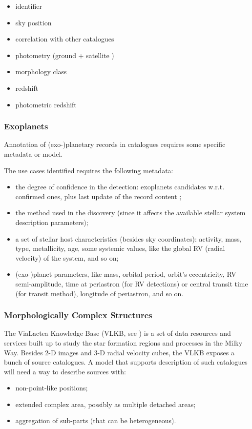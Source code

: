 \documentclass[11pt,a4paper]{ivoa}
\begin{document}
\begin{itemize}
    \item identifier
    \item sky position
    \item correlation with other catalogues
    \item photometry (ground + satellite )
    \item morphology class
    \item redshift
    \item photometric redshift
\end{itemize}

\subsubsection{Exoplanets}
Annotation of (exo-)planetary records in catalogues requires some
specific metadata or model.

The use cases identified requires the following metadata:
\begin{itemize}
	\item the degree of confidence in the detection: exoplanets candidates
w.r.t. confirmed ones, plus last update of the record content ;
	\item the method used in the discovery (since it affects the available
stellar system description parameters);
	\item a set of stellar host characteristics (besides sky coordinates):
activity, mass, type,
metallicity, age, some systemic values, like the global RV (radial
velocity) of the system, and so on;
	\item (exo-)planet parameters, like mass, orbital period, orbit's
eccentricity, RV semi-amplitude, time at periastron (for RV detections)
or central transit time (for transit method), longitude of periastron,
and so on.
\end{itemize}


\subsubsection{Morphologically Complex Structures}
The ViaLactea Knowledge Base (VLKB, see \cite{2016SPIE.9913E..0HM}) is a set of data
resources and services built up to study the star formation regions and
processes in the Milky Way. Besides 2-D images and 3-D radial velocity
cubes, the VLKB exposes a bunch of source catalogues.
A model that supports description of such catalogues will need a
way to describe sources with:
\begin{itemize}
	\item non-point-like positions;
	\item extended complex area, possibly as multiple detached areas;
	\item aggregation of sub-parts (that can be heterogeneous).
\end{itemize}
\end{document}
